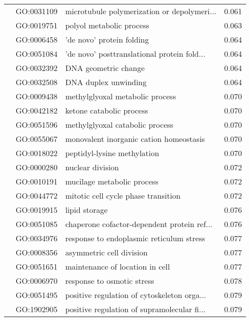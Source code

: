 \begin{longtable}{lllr}
   & GO:0031109 &  microtubule polymerization or depolymeri... &         0.061 \\
   & GO:0019751 &                     polyol metabolic process &         0.063 \\
   & GO:0006458 &                    'de novo' protein folding &         0.064 \\
   & GO:0051084 &  'de novo' posttranslational protein fold... &         0.064 \\
   & GO:0032392 &                         DNA geometric change &         0.064 \\
   & GO:0032508 &                         DNA duplex unwinding &         0.064 \\
   & GO:0009438 &              methylglyoxal metabolic process &         0.070 \\
   & GO:0042182 &                     ketone catabolic process &         0.070 \\
   & GO:0051596 &              methylglyoxal catabolic process &         0.070 \\
   & GO:0055067 &      monovalent inorganic cation homeostasis &         0.070 \\
   & GO:0018022 &                  peptidyl-lysine methylation &         0.070 \\
   & GO:0000280 &                             nuclear division &         0.072 \\
   & GO:0010191 &                   mucilage metabolic process &         0.072 \\
   & GO:0044772 &          mitotic cell cycle phase transition &         0.072 \\
   & GO:0019915 &                                lipid storage &         0.076 \\
   & GO:0051085 &  chaperone cofactor-dependent protein ref... &         0.076 \\
   & GO:0034976 &     response to endoplasmic reticulum stress &         0.077 \\
   & GO:0008356 &                     asymmetric cell division &         0.077 \\
   & GO:0051651 &              maintenance of location in cell &         0.077 \\
   & GO:0006970 &                   response to osmotic stress &         0.078 \\
   & GO:0051495 &  positive regulation of cytoskeleton orga... &         0.079 \\
   & GO:1902905 &  positive regulation of supramolecular fi... &         0.079 \\

\end{longtable}
